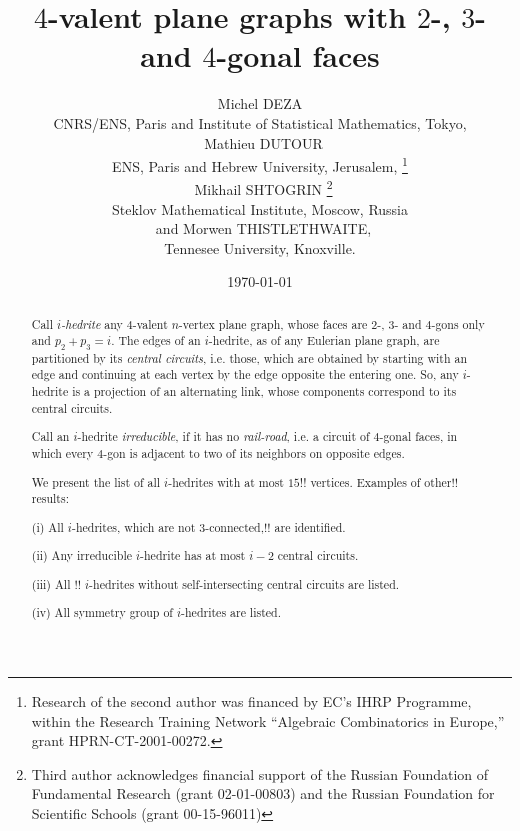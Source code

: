 \documentclass[12pt]{article}
\begin{document}
\title{$4$-valent plane graphs with $2$-, $3$- and $4$-gonal faces}




\author{Michel DEZA\\
CNRS/ENS, Paris and Institute of Statistical Mathematics, Tokyo,\\
\ Mathieu DUTOUR \\
ENS, Paris and Hebrew University, Jerusalem,
\footnote{Research of the second author was financed by EC's IHRP Programme, within the Research Training Network ``Algebraic Combinatorics in Europe,'' grant HPRN-CT-2001-00272.}\\
\ Mikhail SHTOGRIN 
\thanks{Third author acknowledges financial support of the Russian Foundation of Fundamental Research (grant 02-01-00803) and the Russian Foundation for Scientific Schools (grant 00-15-96011)}\\
Steklov Mathematical Institute, Moscow, Russia\\
\ and Morwen THISTLETHWAITE,\\
Tennesee University, Knoxville.
}
\date{\today}


\maketitle



\begin{abstract}
Call {\em $i$-hedrite} any $4$-valent $n$-vertex plane graph, whose 
faces are $2$-, $3$- and $4$-gons only and $p_2+p_3=i$. The edges of an $i$-hedrite, as of 
any Eulerian plane graph, are partitioned
by its {\em central circuits}, i.e. those, which are obtained by starting with an
edge and continuing at each vertex by the edge opposite the entering one. 
So, any $i$-hedrite is a projection of an alternating link, whose components
correspond to its central circuits.

Call an $i$-hedrite {\em irreducible}, if it has no 
{\em rail-road}, i.e. a 
circuit of $4$-gonal faces, in which every $4$-gon is adjacent to two of its 
neighbors on opposite edges.

We present the list of all $i$-hedrites with at most $15!!$ vertices. Examples
of other!! results: 

(i) All $i$-hedrites, which are not $3$-connected,!! are identified.

(ii) Any irreducible $i$-hedrite has at most $i-2$ central circuits.

(iii) All !! $i$-hedrites without self-intersecting central circuits are listed.

(iv) All symmetry group of $i$-hedrites are listed.

\end{abstract}
\end{document}
